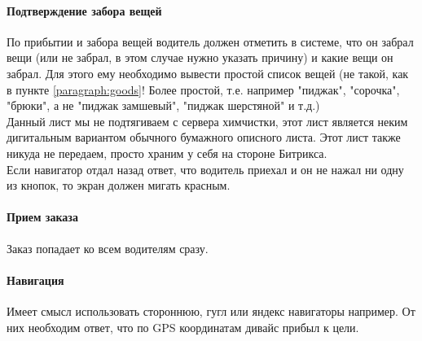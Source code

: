 \documentclass[DIV=calc, paper=a4, fontsize=11pt]{scrartcl} %
\begin{document}
\paragraph{Подтверждение забора вещей}
По прибытии и забора вещей водитель должен отметить в системе, что он забрал вещи (или не забрал, в этом случае нужно указать причину) и какие вещи он забрал. Для этого ему необходимо вывести простой список вещей (не такой, как в пункте \ref{paragraph:goods}! Более простой, т.е. например "пиджак", "сорочка", "брюки", а не "пиджак замшевый", "пиджак шерстяной" и т.д.)
\\[0.5cm]
Данный лист мы не подтягиваем с сервера химчистки, этот лист является неким дигитальным вариантом обычного бумажного описного листа. Этот лист также никуда не передаем, просто храним у себя на стороне Битрикса.
\\[0.5cm]
Если навигатор отдал назад ответ, что водитель приехал и он не нажал ни одну из кнопок, то экран должен мигать красным.

\paragraph{Прием заказа}
Заказ попадает ко всем водителям сразу. 



\paragraph{Навигация}
Имеет смысл использовать стороннюю, гугл или яндекс навигаторы например. От них необходим ответ, что по GPS координатам дивайс прибыл к цели.
\end{document}
